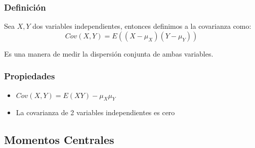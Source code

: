 \documentclass[12pt, fleqn]{report}                             %
\theoremstyle{break}                                            %
\newcommand{\Wrap}[1]           {\left( #1 \right)}             %
\begin{document}
                \subsubsection{Definición}

                    Sea $X, Y$ dos variables independientes, entonces
                    definimos a la covarianza como:
                    \begin{equation*}
                        Cov(X, Y)
                            = E\Wrap{(X - \mu_{X})(Y - \mu_{Y})}
                    \end{equation*}

                    Es una manera de medir la dispersión conjunta de ambas variables.



                
                \subsubsection{Propiedades}

                    \begin{itemize}

                        \item 
                            $Cov(X, Y) = E(X Y) - \mu_{X}\mu_{Y}$


                        \item La covarianza de 2 variables independientes es cero

                                
                    \end{itemize}




            \clearpage
            \subsection{Momentos Centrales}
\end{document}
